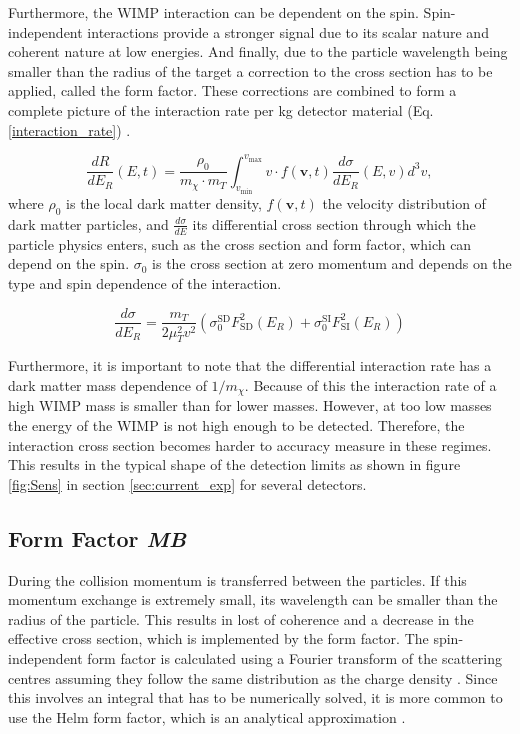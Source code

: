 \documentclass{article}
\begin{document}
Furthermore, the WIMP interaction can be dependent on the spin. Spin-independent interactions provide a stronger signal due to its scalar nature and coherent nature at low energies. And finally, due to the particle wavelength being smaller than the radius of the target a correction to the cross section has to be applied, called the form factor. These corrections are combined to form a complete picture of the interaction rate per kg detector material (Eq. \ref{interaction_rate}) \cite{Lewin:1995rx, Undagoitia:2015gya}.

\begin{equation} \label{interaction_rate}
    \frac{dR}{dE_R}(E,t) = \frac{\rho_0}{m_\chi \cdot m_T} \int_{v_\text{min}}^{v_\text{max}} v \cdot f(\textbf{v},t) \frac{d \sigma}{dE_R} (E, v)d^3v,
\end{equation}
where $\rho_0$ is the local dark matter density, $f(\mathbf{v}, t)$ the velocity distribution of dark matter particles, and $\tfrac{d\sigma}{dE}$ its differential cross section through which the particle physics enters, such as the cross section and form factor, which can depend on the spin. $\sigma_0$ is the cross section at zero momentum and depends on the type and spin dependence of the interaction. 

\begin{equation} \label{Eff_cross}
    \frac{d\sigma}{dE_R} = \frac{m_T}{2\mu_T^2 v^2} \left( \sigma_0^\text{SD} F^2_\text{SD}(E_R) + \sigma_0^\text{SI} F^2_\text{SI}(E_R)\right)
\end{equation}

Furthermore, it is important to note that the differential interaction rate has a dark matter mass dependence of $1/m_\chi$. Because of this the interaction rate of a high WIMP mass is smaller than for lower masses. However, at too low masses the energy of the WIMP is not high enough to be detected. Therefore, the interaction cross section becomes harder to accuracy measure in these regimes. This results in the typical shape of the detection limits as shown in figure \ref{fig:Sens} in section \ref{sec:current_exp} for several detectors.



\subsection{Form Factor \small{\textit{MB}}}

During the collision momentum is transferred between the particles. If this momentum exchange is extremely small, its wavelength can be smaller than the radius of the particle. This results in lost of coherence and a decrease in the effective cross section, which is implemented by the form factor. 
The spin-independent form factor is calculated using a Fourier transform of the scattering centres assuming they follow the same distribution as the charge density \cite{Lewin:1995rx}. Since this involves an integral that has to be numerically solved, it is more common to use the Helm form factor, which is an analytical approximation \cite{Helm:1956zz}.
\end{document}
